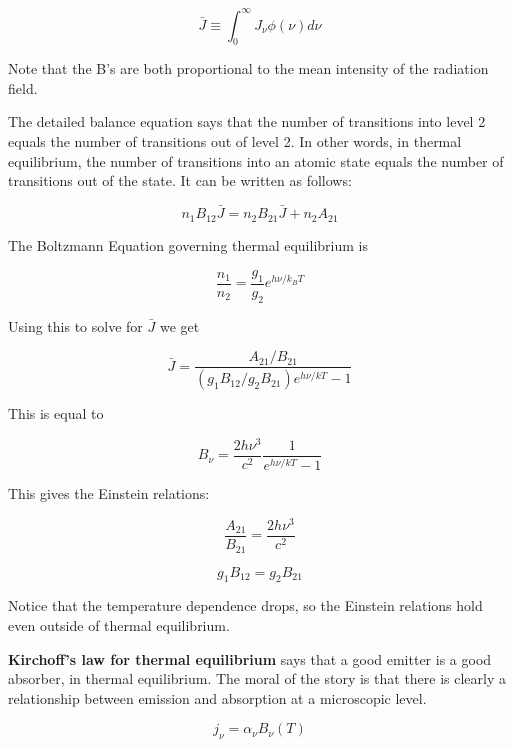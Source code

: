 \documentclass[12pt, letterpaper, preprint]{aastex}
\begin{document}
\begin{enumerate}
\begin{equation}
  \bar{J} \equiv \int_0^\infty J_\nu \phi(\nu) d\nu
  \label{jbar}
\end{equation}

Note that the B's are both proportional to the mean intensity
of the radiation field.

The detailed balance equation says that the number of transitions into level 2
equals the number of transitions out of level 2. In other words,
in thermal equilibrium, the number of transitions into an atomic state
equals the number of transitions out of the state. 
It can be written as follows:

\begin{equation}
  n_1 B_{12} \bar{J} = n_2 B_{21} \bar{J} + n_2 A_{21}
  \label{detailed-balance}
\end{equation}

The Boltzmann Equation governing thermal equilibrium is

\begin{equation}
  \frac{n_1}{n_2} = \frac{g_1}{g_2} e^{h \nu / k_B T}
  \label{boltzmann-eq}
\end{equation}

Using this to solve for $\bar{J}$ we get

$$ \bar{J} = \frac{A_{21} / B_{21}}{(g_1 B_{12}/g_2 B_{21}) e^{h\nu/kT} - 1} $$

This is equal to 

$$ B_\nu = \frac{2 h \nu^3}{c^2} \frac{1}{e^{h\nu/kT}-1} $$

This gives the Einstein relations:

\begin{equation}
  \frac{A_{21}}{B_{21}} = \frac{2 h \nu^3}{c^2}
  \label{einstein-A}
\end{equation}

\begin{equation}
  g_1 B_{12} = g_2 B_{21}
  \label{einstein-B}
\end{equation}

Notice that the temperature dependence drops,
so the Einstein relations hold even outside of
thermal equilibrium.

\textbf{Kirchoff's law for thermal equilibrium}
says that a good emitter is a good absorber, in
thermal equilibrium. The moral of the story is that
there is clearly a relationship between emission
and absorption at a microscopic level.

\begin{equation}
  j_\nu = \alpha_\nu B_\nu (T)
  \label{kirchoff-law}
\end{equation}


\end{enumerate}
\end{document}
